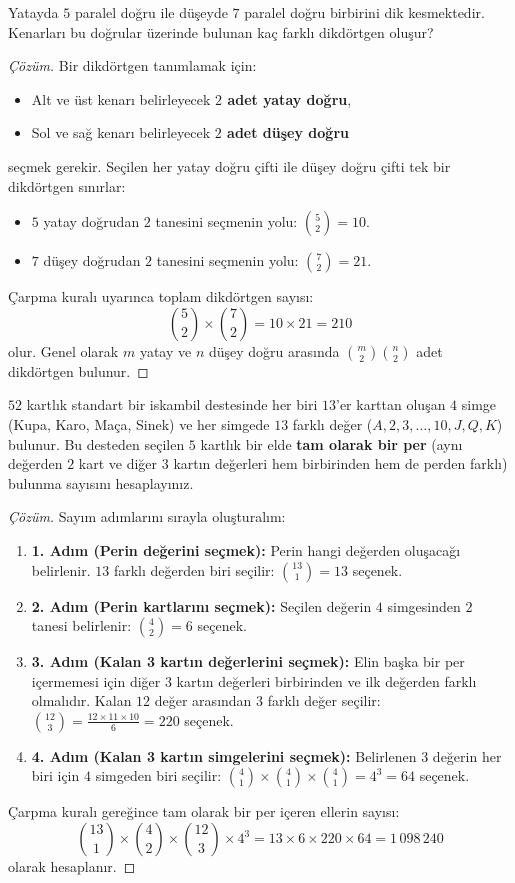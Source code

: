 \begin{example}
Yatayda $5$ paralel doğru ile düşeyde $7$ paralel doğru birbirini dik kesmektedir. Kenarları bu doğrular üzerinde bulunan kaç farklı dikdörtgen oluşur?
\end{example}
\begin{proof}[Çözüm]
Bir dikdörtgen tanımlamak için:
\begin{itemize}
  \item Alt ve üst kenarı belirleyecek \textbf{$2$ adet yatay doğru},
  \item Sol ve sağ kenarı belirleyecek \textbf{$2$ adet düşey doğru}
\end{itemize}
seçmek gerekir. Seçilen her yatay doğru çifti ile düşey doğru çifti tek bir dikdörtgen sınırlar:
\begin{itemize}
  \item $5$ yatay doğrudan $2$ tanesini seçmenin yolu: $\binom{5}{2} = 10$.
  \item $7$ düşey doğrudan $2$ tanesini seçmenin yolu: $\binom{7}{2} = 21$.
\end{itemize}
Çarpma kuralı uyarınca toplam dikdörtgen sayısı:
\[ \binom{5}{2} \times \binom{7}{2} = 10 \times 21 = 210 \]
olur. Genel olarak $m$ yatay ve $n$ düşey doğru arasında $\binom{m}{2}\binom{n}{2}$ adet dikdörtgen bulunur.
\end{proof}

\begin{example}
$52$ kartlık standart bir iskambil destesinde her biri $13$'er karttan oluşan $4$ simge (Kupa, Karo, Maça, Sinek) ve her simgede $13$ farklı değer ($A, 2, 3, \dots, 10, J, Q, K$) bulunur. Bu desteden seçilen $5$ kartlık bir elde \textbf{tam olarak bir per} (aynı değerden $2$ kart ve diğer $3$ kartın değerleri hem birbirinden hem de perden farklı) bulunma sayısını hesaplayınız.
\end{example}
\begin{proof}[Çözüm]
Sayım adımlarını sırayla oluşturalım:
\begin{enumerate}
  \item \textbf{1. Adım (Perin değerini seçmek):} Perin hangi değerden oluşacağı belirlenir. $13$ farklı değerden biri seçilir: $\binom{13}{1} = 13$ seçenek.
  \item \textbf{2. Adım (Perin kartlarını seçmek):} Seçilen değerin $4$ simgesinden $2$ tanesi belirlenir: $\binom{4}{2} = 6$ seçenek.
  \item \textbf{3. Adım (Kalan 3 kartın değerlerini seçmek):} Elin başka bir per içermemesi için diğer $3$ kartın değerleri birbirinden ve ilk değerden farklı olmalıdır. Kalan $12$ değer arasından $3$ farklı değer seçilir: $\binom{12}{3} = \frac{12 \times 11 \times 10}{6} = 220$ seçenek.
  \item \textbf{4. Adım (Kalan 3 kartın simgelerini seçmek):} Belirlenen $3$ değerin her biri için $4$ simgeden biri seçilir: $\binom{4}{1} \times \binom{4}{1} \times \binom{4}{1} = 4^3 = 64$ seçenek.
\end{enumerate}
Çarpma kuralı gereğince tam olarak bir per içeren ellerin sayısı:
\[ \binom{13}{1} \times \binom{4}{2} \times \binom{12}{3} \times 4^3 = 13 \times 6 \times 220 \times 64 = 1\,098\,240 \]
olarak hesaplanır.
\end{proof}
